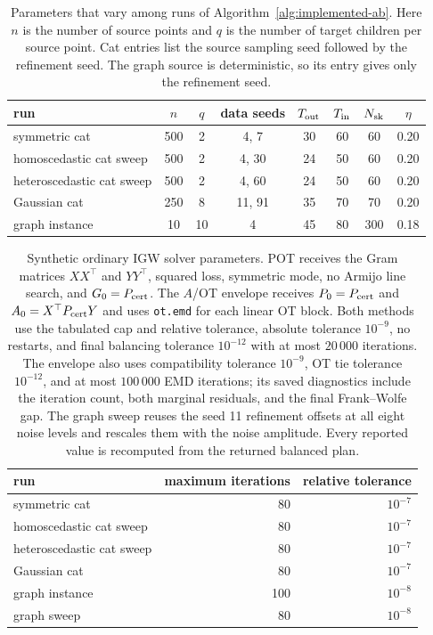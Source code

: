 \documentclass[11pt]{article}
\theoremstyle{plain}
\theoremstyle{definition}
\theoremstyle{remark}
\begin{document}
\begin{table}[H]
\centering
\footnotesize
\renewcommand{\arraystretch}{1.08}
\begin{tabularx}{\textwidth}{@{}>{\raggedright\arraybackslash}Xcc@{\hspace{.8em}}c@{\hspace{.8em}}cccc@{}}
\toprule
run & \(n\) & \(q\) & data seeds & \(T_{\rm out}\) & \(T_{\rm in}\) &
\(N_{\rm sk}\) & \(\eta\)\\
\midrule
symmetric cat & 500 & 2 & 4, 7 & 30 & 60 & 60 & 0.20\\
homoscedastic cat sweep & 500 & 2 & 4, 30 & 24 & 50 & 60 & 0.20\\
heteroscedastic cat sweep & 500 & 2 & 4, 60 & 24 & 50 & 60 & 0.20\\
Gaussian cat & 250 & 8 & 11, 91 & 35 & 70 & 70 & 0.20\\
graph instance & 10 & 10 & 4 & 45 & 80 & 300 & 0.18\\
\bottomrule
\end{tabularx}
\caption{Parameters that vary among runs of Algorithm~\ref{alg:implemented-ab}.
Here \(n\) is the number of source points
and \(q\) is the number of target children per source point. Cat entries list the
source sampling seed followed by the refinement seed. The graph source is
deterministic, so its entry gives only the refinement seed.}
\label{tab:run-ab-config}
\end{table}

\begin{table}[H]
\centering
\small
\begin{tabular}{@{}lrr@{}}
\toprule
run & maximum iterations & relative tolerance\\
\midrule
symmetric cat & 80 & \(10^{-7}\)\\
homoscedastic cat sweep & 80 & \(10^{-7}\)\\
heteroscedastic cat sweep & 80 & \(10^{-7}\)\\
Gaussian cat & 80 & \(10^{-7}\)\\
graph instance & 100 & \(10^{-8}\)\\
graph sweep & 80 & \(10^{-8}\)\\
\bottomrule
\end{tabular}
\caption{Synthetic ordinary IGW solver parameters. POT receives the Gram
matrices \(XX^\top\) and \(YY^\top\), squared loss, symmetric mode, no Armijo
line search, and $G_0=P_{\rm cert}$. The $A$/OT envelope receives
$P_0=P_{\rm cert}$ and $A_0=X^\top P_{\rm cert}Y$ and uses
\texttt{ot.emd} for each linear OT block. Both methods use the tabulated cap and
relative tolerance, absolute tolerance $10^{-9}$, no restarts, and final
balancing tolerance $10^{-12}$ with at most $20\,000$ iterations. The envelope
also uses compatibility tolerance $10^{-9}$, OT tie tolerance $10^{-12}$, and
at most $100\,000$ EMD iterations; its saved diagnostics include the iteration
count, both marginal residuals, and the final Frank--Wolfe gap. The graph sweep
reuses the seed 11 refinement offsets at all eight noise levels and rescales
them with the noise amplitude. Every reported value is recomputed from the
returned balanced plan.}
\label{tab:synthetic-ordinary-config}
\end{table}
\end{document}
